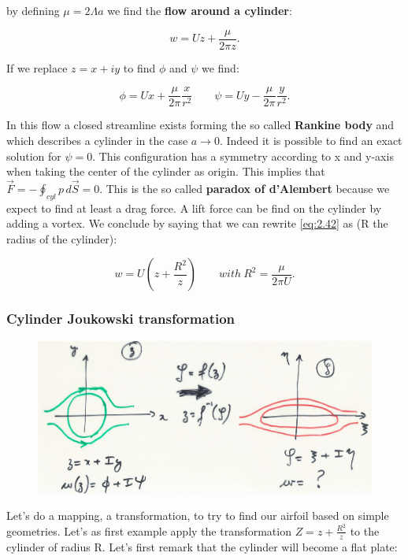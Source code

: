 		by defining $\mu = 2\Lambda a$ we find the \textbf{flow around a cylinder}:
		
		\begin{equation}
		w = Uz + \frac{\mu }{2\pi z}.
		\label{eq:2.42}
		\end{equation}
		
		If we replace $z= x+iy$ to find $\phi$ and $\psi$ we find:
		
		\begin{equation}
		\phi = Ux + \frac{\mu}{2\pi }\frac{x}{r^2} \qquad \psi = Uy - \frac{\mu }{2\pi} \frac{y}{r^2}.
		\end{equation}
		
		In this flow a closed streamline exists forming the so called \textbf{Rankine body} and which describes a cylinder in the case $a\rightarrow 0$. Indeed it is possible to find an exact solution for $\psi = 0$. This configuration has a symmetry according to x and y-axis when taking the center of the cylinder as origin. This implies that $\vec{F} = - \oint _{cyl} p\, d\vec{S} = 0$. This is the so called \textbf{paradox of d'Alembert} because we expect to find at least a drag force. A lift force can be find on the cylinder by adding a vortex. We conclude by saying that we can rewrite \eqref{eq:2.42} as (R the radius of the cylinder):
		
		\begin{equation}
		w = U\left( z + \frac{R^2}{z} \right) \qquad with \ R^2 = \frac{\mu }{2\pi U}.
		\end{equation}
		
		\newpage
		
	\subsubsection{Cylinder Joukowski transformation}
		\begin{figure}
		\vspace{-5mm}
		\includegraphics[scale=0.1]{ch2/28}
		\end{figure}
		Let's do a mapping, a transformation, to try to find our airfoil based on simple geometries. Let's as first example apply the transformation $Z = z + \frac{R^2}{z}$ to the cylinder of radius R. Let's first remark that the cylinder will become a flat plate:
		
